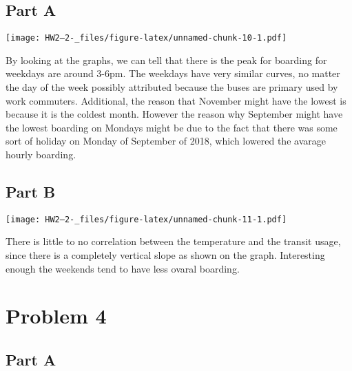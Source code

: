 \documentclass[
]{article}
\begin{document}
\hypertarget{part-a-2}{%
\subsection{Part A}\label{part-a-2}}

\texttt{[image: HW2--2-\_files/figure-latex/unnamed-chunk-10-1.pdf]}

By looking at the graphs, we can tell that there is the peak for
boarding for weekdays are around 3-6pm. The weekdays have very similar
curves, no matter the day of the week possibly attributed because the
buses are primary used by work commuters. Additional, the reason that
November might have the lowest is because it is the coldest month.
However the reason why September might have the lowest boarding on
Mondays might be due to the fact that there was some sort of holiday on
Monday of September of 2018, which lowered the avarage hourly boarding.

\hypertarget{part-b-2}{%
\subsection{Part B}\label{part-b-2}}

\texttt{[image: HW2--2-\_files/figure-latex/unnamed-chunk-11-1.pdf]}

There is little to no correlation between the temperature and the
transit usage, since there is a completely vertical slope as shown on
the graph. Interesting enough the weekends tend to have less ovaral
boarding.

\hypertarget{problem-4}{%
\section{Problem 4}\label{problem-4}}

\hypertarget{part-a-3}{%
\subsection{Part A}\label{part-a-3}}
\end{document}
